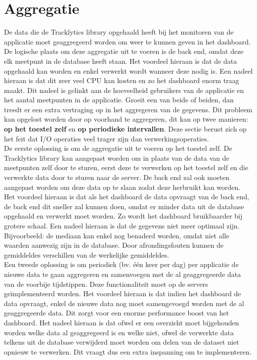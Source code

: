 \section{Aggregatie}
De data die de Tracklytics library opgehaald heeft bij het monitoren van de applicatie moet geaggregeerd worden om weer te kunnen geven in het dashboard. De logische plaats om deze aggregatie uit te voeren is de back end, omdat deze elk meetpunt in de database heeft staan. Het voordeel hieraan is dat de data opgehaald kan worden en enkel verwerkt wordt wanneer deze nodig is. Een nadeel hieraan is dat dit zeer veel CPU kan kosten en zo het dashboard enorm traag maakt. Dit nadeel is gelinkt aan de hoeveelheid gebruikers van de applicatie en het aantal meetpunten in de applicatie. Groeit een van beide of beiden, dan treedt er een extra vertraging op in het aggregeren van de gegevens. Dit probleem kan opgelost worden door op voorhand te aggregeren, dit kan op twee manieren: \textbf{op het toestel zelf} en \textbf{op periodieke intervallen}. Deze sectie berust zich op het feit dat I/O operaties veel trager zijn dan verwerkingsoperaties.\\

De eerste oplossing is om de aggregatie uit te voeren op het toestel zelf. De Tracklytics library kan aangepast worden om in plaats van de data van de meetpunten zelf door te sturen, eerst deze te verwerken op het toestel zelf en die verwerkte data door te sturen naar de server. De back end zal ook moeten aangepast worden om deze data op te slaan zodat deze herbruikt kan worden. Het voordeel hieraan is dat als het dashboard de data opvraagt van de back end, de back end dit sneller zal kunnen doen, omdat er minder data uit de database opgehaald en verwerkt moet worden. Zo wordt het dashboard bruikbaarder bij grotere schaal. Een nadeel hieraan is dat de gegevens niet meer optimaal zijn. Bijvoorbeeld: de mediaan kan enkel nog benaderd worden, omdat niet alle waarden aanwezig zijn in de database. Door afrondingsfouten kunnen de gemiddeldes verschillen van de werkelijke gemiddeldes. \\

Een tweede oplossing is om periodiek (bv. \'e\'en keer per dag) per applicatie de nieuwe data te gaan aggregeren en samenvoegen met de al geaggregeerde data van de voorbije tijdstippen. Deze functionaliteit moet op de servers ge\"implementeerd worden. Het voordeel hieraan is dat indien het dashboard de data opvraagt, enkel de nieuwe data nog moet samengevoegd worden met de al geaggregeerde data. Dit zorgt voor een enorme performance boost van het dashboard. Het nadeel hieraan is dat ofwel er een overzicht moet bijgehouden worden welke data al geaggregeerd is en welke niet, ofwel de verwerkte data telkens uit de database verwijderd moet worden om delen van de dataset niet opnieuw te verwerken. Dit vraagt dus een extra inspanning om te implementeren. \\

